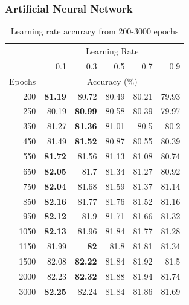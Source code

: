 \documentclass[12pt]{article}
\begin{document}
    \subsubsection{Artificial Neural Network}
      \begin{table}[H]
        \centering
        \caption{Learning rate accuracy from 200-3000 epochs}
          \begin{tabular}{r|rrrrr}
          \toprule
          \multicolumn{1}{r}{} & \multicolumn{5}{|c}{Learning Rate} \\
          & 0.1   & 0.3   & 0.5   & 0.7   & 0.9 \\
          \midrule
              Epochs & \multicolumn{5}{|c}{Accuracy (\%)} \\
          \midrule
          200   & \textbf{81.19} & 80.72 & 80.49 & 80.21 & 79.93 \\
          250   & 80.19 & \textbf{80.99} & 80.58 & 80.39 & 79.97 \\
          350   & 81.27 & \textbf{81.36} & 81.01 & 80.5  & 80.2 \\
          450   & 81.49 & \textbf{81.52} & 80.87 & 80.55 & 80.39 \\
          550   & \textbf{81.72} & 81.56 & 81.13 & 81.08 & 80.74 \\
          650   & \textbf{82.05} & 81.7  & 81.34 & 81.27 & 80.92 \\
          750   & \textbf{82.04} & 81.68 & 81.59 & 81.37 & 81.14 \\
          850   & \textbf{82.16} & 81.77 & 81.76 & 81.52 & 81.16 \\
          950   & \textbf{82.12} & 81.9  & 81.71 & 81.66 & 81.32 \\
          1050  & \textbf{82.13} & 81.96 & 81.84 & 81.77 & 81.28 \\
          1150  & 81.99 & \textbf{82} & 81.8  & 81.81 & 81.34 \\
          1500  & 82.08 & \textbf{82.22} & 81.84 & 81.92 & 81.5 \\
          2000  & 82.23 & \textbf{82.32} & 81.88 & 81.94 & 81.74 \\
          3000  & \textbf{82.25} & 82.24 & 81.84 & 81.86 & 81.69 \\
          \bottomrule
          \end{tabular}%
        \label{tab:addlabel}%
      \end{table}%
\end{document}

